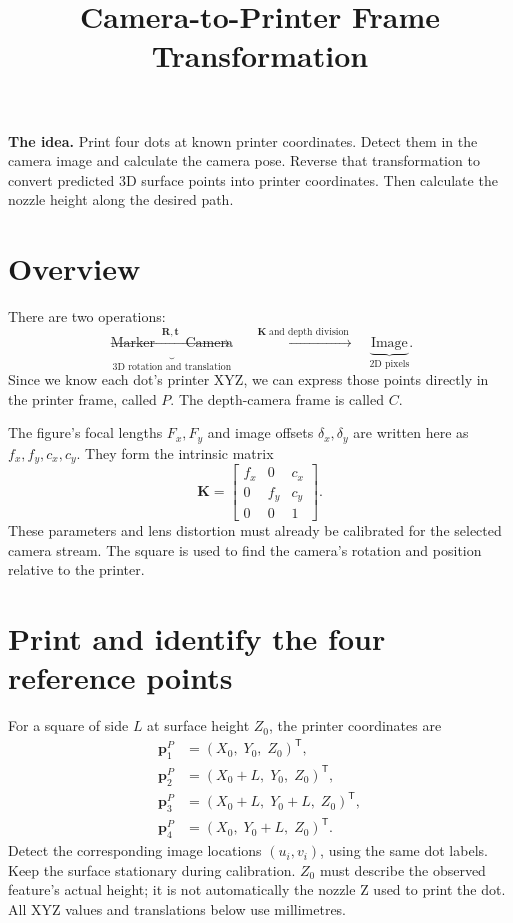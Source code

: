 \documentclass[11pt,letterpaper]{article}
\title{Camera-to-Printer Frame Transformation}
\date{}
\newcommand{\p}{\mathbf p}
\newcommand{\R}{\mathbf R}
\newcommand{\tr}{\mathbf t}
\newcommand{\K}{\mathbf K}
\newcommand{\tp}{\mathsf T}
\begin{document}
\maketitle
\vspace{-1.5em}

\textbf{The idea.} Print four dots at known printer coordinates. Detect them
in the camera image and calculate the camera pose. Reverse that transformation
to convert predicted 3D surface points into printer coordinates. Then calculate
the nozzle height along the desired path.

\section{Overview}
There are two operations:
\[
\underbrace{\text{Marker}\;\xrightarrow{\;\R,\tr\;}\;\text{Camera}}_
 {\text{3D rotation and translation}}
\quad\xrightarrow{\;\K\;\text{and depth division}\;}\quad
\underbrace{\text{Image}}_{\text{2D pixels}}.
\]
Since we know each dot's printer XYZ, we can express those points directly in the
printer frame, called $P$. The depth-camera frame is called $C$.

The figure's focal lengths $F_x,F_y$ and image offsets $\delta_x,\delta_y$
are written here as $f_x,f_y,c_x,c_y$. They form the intrinsic matrix
\begin{equation}
 \K=\begin{bmatrix}f_x&0&c_x\\0&f_y&c_y\\0&0&1\end{bmatrix}.
\end{equation}
These parameters and lens distortion must already be calibrated for the
selected camera stream. The square is used to find the camera's rotation
and position relative to the printer.

\section{Print and identify the four reference points}
For a square of side $L$ at surface height $Z_0$, the printer coordinates are
\begin{equation}
\begin{aligned}
 \p^P_1&=(X_0,\;Y_0,\;Z_0)^\tp,\\
 \p^P_2&=(X_0+L,\;Y_0,\;Z_0)^\tp,\\
 \p^P_3&=(X_0+L,\;Y_0+L,\;Z_0)^\tp,\\
 \p^P_4&=(X_0,\;Y_0+L,\;Z_0)^\tp.
\end{aligned}
\label{eq:square}
\end{equation}
Detect the corresponding image locations $(u_i,v_i)$, using the same dot
labels. Keep the surface stationary during calibration. $Z_0$ must describe
the observed feature's actual height; it is not automatically the nozzle Z
used to print the dot. All XYZ values and translations below use millimetres.
\end{document}
